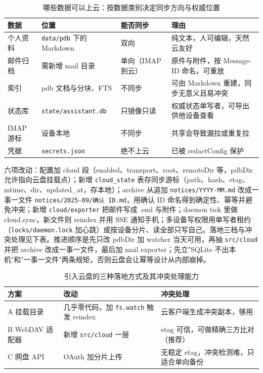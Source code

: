 \documentclass[a4paper]{article}
\begin{document}
\begin{table}[H]
\centering
\begin{tabular}{p{1.7cm}p{3.8cm}p{2.1cm}p{6.9cm}}
\toprule
数据 & 位置 & 能否同步 & 理由 \\
\midrule
个人资料 & \texttt{data/pdb} 下的 Markdown & 双向 & 纯文本，人可编辑，天然云友好 \\
邮件归档 & 需新增 mail 目录 & 单向（IMAP 到云） & 原件与附件，按 Message-ID 命名，可重放 \\
索引 & pdb 文档与分块、FTS & 不同步 & 可由 Markdown 重建，同步无意义且易冲突 \\
状态库 & \texttt{state/assistant.db} & 只镜像只读 & 权威状态单写者，可导出供他设备查看 \\
IMAP 游标 & 设备本地 & 不同步 & 共享会导致漏拉或重复拉 \\
凭据 & \texttt{secrets.json} & 绝不上云 & 已被 redactConfig 保护 \\
\bottomrule
\end{tabular}
\caption{哪些数据可以上云：按数据类别决定同步方向与权威位置}
\end{table}

六项改动：配置加 cloud 段（enabled、transport、root、remoteDir 等，pdbDir 允许指向云盘挂载点）；新增 \texttt{cloud\_state} 表存同步游标（path、hash、etag、mtime、dir、updated\_at，存本地）；archive 从追加 \texttt{notices/YYYY-MM.md} 改成一事一文件 \texttt{notices/2025-09/确认 ID.md}，用确认 ID 命名得到确定性、幂等并避免冲突；新增 \texttt{cloud/exporter} 把邮件写成 .eml 与附件；daemon tick 里做 cloud.sync，新文件则 reindex 并用 SSE 通知手机；多设备写权限用单写者租约（\texttt{locks/daemon.lock} 加心跳）或按设备分片、读全部只写自己。落地三档与冲突处理见下表。推进顺序是先只改 pdbDir 加 watcher 当天可用，再抽 \texttt{src/cloud} 并把 archive 改成一事一文件，最后加 mail exporter；先立"SQLite 不出本机"和"一事一文件"两条规矩，否则云盘会让幂等设计从内部崩掉。

\begin{table}[H]
\centering
\begin{tabular}{p{2.3cm}p{6.0cm}p{6.0cm}}
\toprule
方案 & 改动 & 冲突处理 \\
\midrule
A 挂载目录 & 几乎零代码，加 \texttt{fs.watch} 触发 reindex & 云客户端生成冲突副本，够用 \\
B WebDAV 适配器 & 新增 \texttt{src/cloud} 一层 & etag 可信，可做精确三方比对（推荐） \\
C 网盘 API & OAuth 加分片上传 & 无稳定 etag，冲突检测难，只适合单向备份 \\
\bottomrule
\end{tabular}
\caption{引入云盘的三种落地方式及其冲突处理能力}
\end{table}
\end{document}
